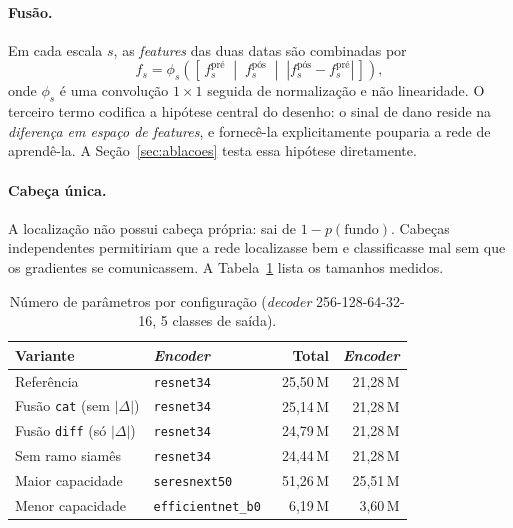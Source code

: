 \documentclass[11pt,a4paper]{article}
\begin{document}
\paragraph{Fusão.} Em cada escala $s$, as \emph{features} das duas datas são
combinadas por
\begin{equation}
  f_s = \phi_s\!\left(\left[\, f_s^{\text{pré}} \;\middle|\;
        f_s^{\text{pós}} \;\middle|\;
        \left| f_s^{\text{pós}} - f_s^{\text{pré}} \right| \,\right]\right),
  \label{eq:fusao}
\end{equation}
onde $\phi_s$ é uma convolução $1\times1$ seguida de normalização e não
linearidade. O terceiro termo codifica a hipótese central do desenho: o sinal de
dano reside na \emph{diferença em espaço de features}, e fornecê-la
explicitamente pouparia a rede de aprendê-la. A Seção~\ref{sec:ablacoes} testa
essa hipótese diretamente.

\paragraph{Cabeça única.} A localização não possui cabeça própria: sai de
$1 - p(\text{fundo})$. Cabeças independentes permitiriam que a rede localizasse
bem e classificasse mal sem que os gradientes se comunicassem. A
Tabela~\ref{tab:params} lista os tamanhos medidos.

\begin{table}[htbp]
\centering
\caption{Número de parâmetros por configuração (\emph{decoder} 256-128-64-32-16,
5 classes de saída).}
\label{tab:params}
\begin{tabular}{llrr}
\toprule
\textbf{Variante} & \textbf{\emph{Encoder}} & \textbf{Total} &
\textbf{\emph{Encoder}} \\
\midrule
Referência & \texttt{resnet34}~\cite{he2016}            & 25{,}50\,M & 21{,}28\,M \\
Fusão \texttt{cat} (sem $|\Delta|$) & \texttt{resnet34} & 25{,}14\,M & 21{,}28\,M \\
Fusão \texttt{diff} (só $|\Delta|$) & \texttt{resnet34} & 24{,}79\,M & 21{,}28\,M \\
Sem ramo siamês & \texttt{resnet34}                     & 24{,}44\,M & 21{,}28\,M \\
Maior capacidade & \texttt{seresnext50}~\cite{xie2017,hu2018} & 51{,}26\,M & 25{,}51\,M \\
Menor capacidade & \texttt{efficientnet\_b0}~\cite{tan2019}   &  6{,}19\,M &  3{,}60\,M \\
\bottomrule
\end{tabular}
\end{table}
\end{document}
